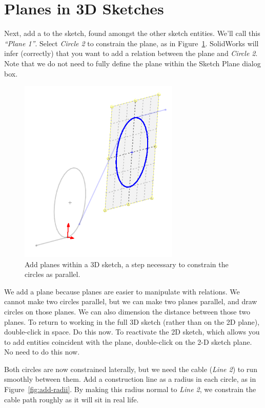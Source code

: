 \section{Planes in 3D Sketches}

Next, add a   to the sketch,
found amongst the other sketch entities. We'll call this \emph{``Plane 1''}. Select \emph{Circle 2} to
constrain the plane, as in Figure~\ref{fig:add-3d-sketch-plane}. SolidWorks will
infer (correctly) that you want to add a  relation between
the plane and \emph{Circle 2}. Note that we do not need to
fully define the plane within the Sketch Plane dialog box.

\begin{figure}[H]
\begin{center}
  \includegraphics[width=3in]{images/figures/add-3d-sketch-plane.png}
\end{center}
\caption{Add planes within a 3D sketch, a step necessary to constrain the
circles as parallel. \label{fig:add-3d-sketch-plane}}

\end{figure}

We add a plane because planes are easier to manipulate with relations. We cannot make two circles
parallel, but we can make two planes parallel, and draw circles on those planes.
We can also dimension the distance between those two planes. To return to working in the full 3D sketch (rather than on the 2D plane),
double-click in space. Do this now. To reactivate the 2D sketch, which allows you to add
entities coincident with the plane, double-click on the 2-D sketch plane. No
need to do this now.

Both circles are now constrained laterally, but we need the cable (\emph{Line 2}) to run
smoothly between them. Add a construction line as a radius in each circle, as in
Figure~\ref{fig:add-radii}. By making this
radius normal to \emph{Line 2}, we constrain the cable path roughly as it will sit in
real life.

